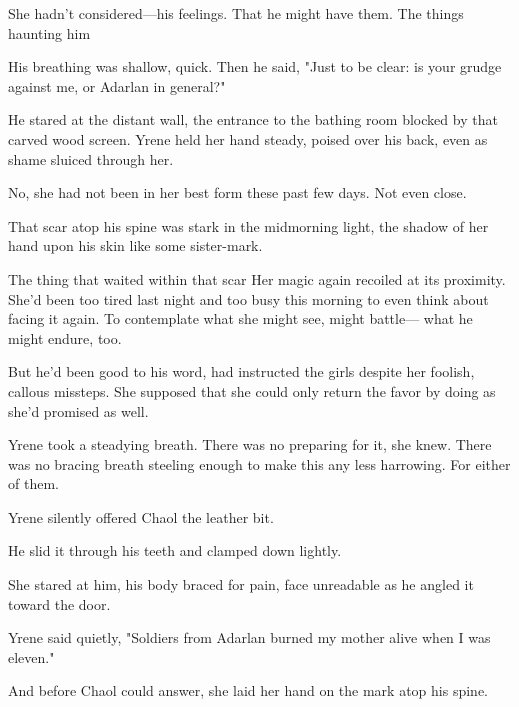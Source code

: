 She hadn't considered---his feelings. That he might have them. The things haunting him 

His breathing was shallow, quick. Then he said, "Just to be clear: is your grudge against me, or Adarlan in general?"

He stared at the distant wall, the entrance to the bathing room blocked by that carved wood screen. Yrene held her hand steady, poised over his back, even as shame sluiced through her.

No, she had not been in her best form these past few days. Not even close.

That scar atop his spine was stark in the midmorning light, the shadow of her hand upon his skin like some sister-mark.

The thing that waited within that scar  Her magic again recoiled at its proximity. She'd been too tired last night and too busy this morning to even think about facing it again. To contemplate what she might see, might battle--- what he might endure, too.

But he'd been good to his word, had instructed the girls despite her foolish, callous missteps. She supposed that she could only return the favor by doing as she'd promised as well.

Yrene took a steadying breath. There was no preparing for it, she knew. There was no bracing breath steeling enough to make this any less harrowing. For either of them.

Yrene silently offered Chaol the leather bit.

He slid it through his teeth and clamped down lightly.

She stared at him, his body braced for pain, face unreadable as he angled it toward the door.

Yrene said quietly, "Soldiers from Adarlan burned my mother alive when I was eleven."

And before Chaol could answer, she laid her hand on the mark atop his spine.


